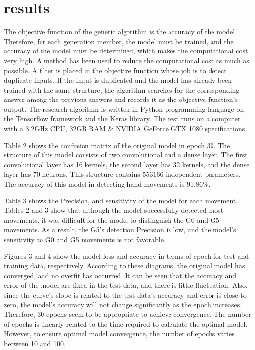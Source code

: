 \section{results}

The objective function of the genetic algorithm is the accuracy of the model. Therefore, for each generation member, the model must be trained, and the accuracy of the model must be determined, which makes the computational cost very high. A method has been used to reduce the computational cost as much as possible. A filter is placed in the objective function whose job is to detect duplicate inputs. If the input is duplicated and the model has already been trained with the same structure, the algorithm searches for the corresponding answer among the previous answers and records it as the objective function's output.
The research algorithm is written in Python programming language on the Tensorflow framework and the Keras library. The test runs on a computer with a 3.2GHz CPU, 32GB RAM \&  NVIDIA GeForce GTX 1080 specifications.

%

Table 2 shows the confusion matrix of the original model in epoch 30. The structure of this model consists of two convolutional and a dense layer. The first convolutional layer has 16 kernels, the second layer has 32 kernels, and the dense layer has 70 neurons. This structure contains 553166 independent parameters. The accuracy of this model in detecting hand movements is 91.86\%.

Table 3 shows the Precision, and sensitivity of the model for each movement. Tables 2 and 3 show that although the model successfully detected most movements, it was difficult for the model to distinguish the G0 and G5 movements. As a result, the G5's detection Precision is low, and the model's sensitivity to G0 and G5 movements is not favorable.

%

Figures 3 and 4 show the model loss and accuracy in terms of epoch for test and training data, respectively. According to these diagrams, the original model has converged, and no overfit has occurred. It can be seen that the accuracy and error of the model are fixed in the test data, and there is little fluctuation. Also, since the curve's slope is related to the test data's accuracy and error is close to zero, the model's accuracy will not change significantly as the epoch increases. Therefore, 30 epochs seem to be appropriate to achieve convergence. The number of epochs is linearly related to the time required to calculate the optimal model. However, to ensure optimal model convergence, the number of epochs varies between 10 and 100.


